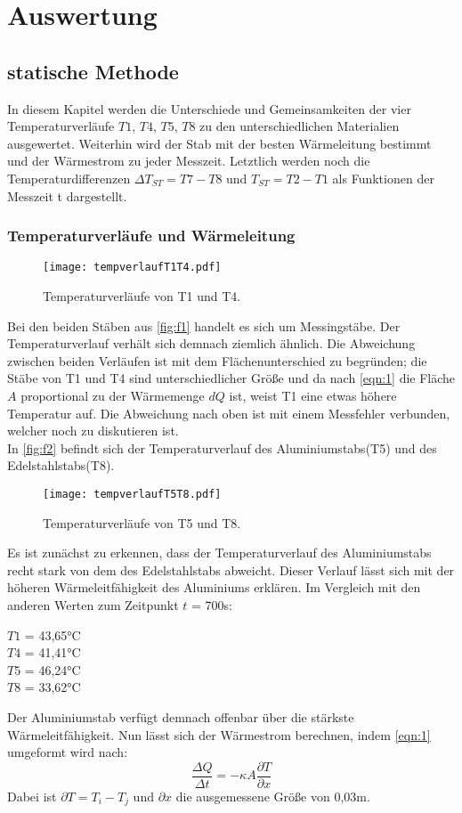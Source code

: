 \section{Auswertung}
\label{sec:Auswertung}

\subsection{statische Methode}
In diesem Kapitel werden die Unterschiede und Gemeinsamkeiten der vier 
Temperaturverläufe $T1$, $T4$, $T5$, $T8$ zu den unterschiedlichen Materialien 
ausgewertet. Weiterhin wird der Stab mit der besten Wärmeleitung bestimmt und 
der Wärmestrom zu jeder Messzeit. Letztlich werden noch die Temperaturdifferenzen 
$\Delta T_{ST}=T7-T8$ und $T_{ST}=T2-T1$ als Funktionen der Messzeit t dargestellt.

\subsubsection{Temperaturverläufe und Wärmeleitung}
\begin{figure}[H]
    \centering
    \texttt{[image: tempverlaufT1T4.pdf]}
    \caption{Temperaturverläufe von T1 und T4.}
    \label{fig:f1}
\end{figure}
Bei den beiden Stäben aus \autoref{fig:f1} handelt es sich um Messingstäbe. Der 
Temperaturverlauf verhält sich demnach ziemlich ähnlich. Die Abweichung zwischen 
beiden Verläufen ist mit dem Flächenunterschied zu begründen; die Stäbe von 
T1 und T4 sind unterschiedlicher Größe und da nach \autoref{eqn:1} die Fläche
$A$ proportional zu der Wärmemenge $dQ$ ist, weist T1 eine etwas höhere Temperatur 
auf. Die Abweichung nach oben ist mit einem Messfehler verbunden, welcher noch 
zu diskutieren ist.
\\
In \autoref{fig:f2} befindt sich der Temperaturverlauf des Aluminiumstabs(T5)
und des Edelstahlstabs(T8).
\begin{figure}[H]
    \centering
    \texttt{[image: tempverlaufT5T8.pdf]}
    \caption{Temperaturverläufe von T5 und T8.}
    \label{fig:f2}
\end{figure}
\noindent Es ist zunächst zu erkennen, dass der Temperaturverlauf des
Aluminiumstabs recht stark von dem des Edelstahlstabs abweicht. Dieser Verlauf
lässt sich mit der höheren Wärmeleitfähigkeit des Aluminiums erklären. Im 
Vergleich mit den anderen Werten zum Zeitpunkt $t$ = 700s:
\begin{center}
  $T1$ = 43,65°C\\
  $T4$ = 41,41°C\\
  $T5$ = 46,24°C\\
  $T8$ = 33,62°C
\end{center}
Der Aluminiumstab verfügt demnach offenbar über die stärkste Wärmeleitfähigkeit.
Nun lässt sich der Wärmestrom berechnen, indem \autoref{eqn:1} umgeformt wird nach:
\begin{equation}
  \frac{\Delta Q}{\Delta t} = - \kappa A \frac{\partial T}{\partial x}
\end{equation}
Dabei ist $\partial T = T_i - T_j$ und $\partial x$ die ausgemessene Größe von 
0,03m.

